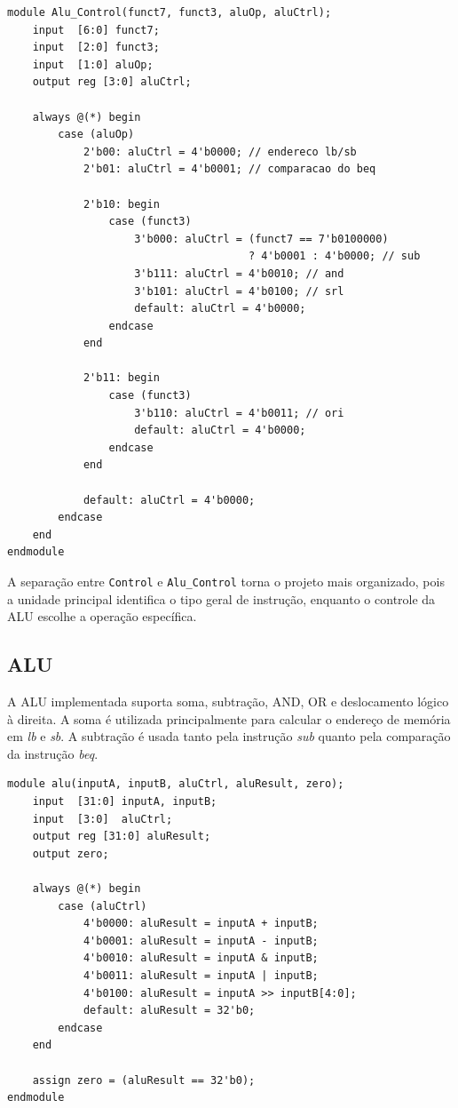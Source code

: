 \documentclass[12pt,a4paper]{article}
\begin{document}
\begin{lstlisting}[style=verilogstyle,caption={Trecho principal do controle da ALU.}]
module Alu_Control(funct7, funct3, aluOp, aluCtrl);
    input  [6:0] funct7;
    input  [2:0] funct3;
    input  [1:0] aluOp;
    output reg [3:0] aluCtrl;

    always @(*) begin
        case (aluOp)
            2'b00: aluCtrl = 4'b0000; // endereco lb/sb
            2'b01: aluCtrl = 4'b0001; // comparacao do beq

            2'b10: begin
                case (funct3)
                    3'b000: aluCtrl = (funct7 == 7'b0100000)
                                      ? 4'b0001 : 4'b0000; // sub
                    3'b111: aluCtrl = 4'b0010; // and
                    3'b101: aluCtrl = 4'b0100; // srl
                    default: aluCtrl = 4'b0000;
                endcase
            end

            2'b11: begin
                case (funct3)
                    3'b110: aluCtrl = 4'b0011; // ori
                    default: aluCtrl = 4'b0000;
                endcase
            end

            default: aluCtrl = 4'b0000;
        endcase
    end
endmodule
\end{lstlisting}

A separação entre \texttt{Control} e \texttt{Alu\_Control} torna o projeto mais organizado, pois a unidade principal identifica o tipo geral de instrução, enquanto o controle da ALU escolhe a operação específica.

\subsection{ALU}

A ALU implementada suporta soma, subtração, AND, OR e deslocamento lógico à direita. A soma é utilizada principalmente para calcular o endereço de memória em \textit{lb} e \textit{sb}. A subtração é usada tanto pela instrução \textit{sub} quanto pela comparação da instrução \textit{beq}.

\begin{lstlisting}[style=verilogstyle,caption={Operações implementadas na ALU.}]
module alu(inputA, inputB, aluCtrl, aluResult, zero);
    input  [31:0] inputA, inputB;
    input  [3:0]  aluCtrl;
    output reg [31:0] aluResult;
    output zero;

    always @(*) begin
        case (aluCtrl)
            4'b0000: aluResult = inputA + inputB;
            4'b0001: aluResult = inputA - inputB;
            4'b0010: aluResult = inputA & inputB;
            4'b0011: aluResult = inputA | inputB;
            4'b0100: aluResult = inputA >> inputB[4:0];
            default: aluResult = 32'b0;
        endcase
    end

    assign zero = (aluResult == 32'b0);
endmodule
\end{lstlisting}
\end{document}
